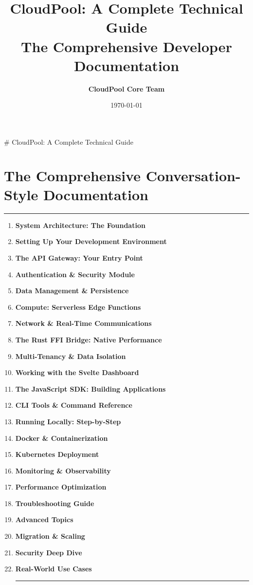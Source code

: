 \documentclass[11pt,a4paper]{report}
\title{\Huge\bfseries\color{primaryblue} CloudPool: A Complete Technical Guide \\ \Large The Comprehensive Developer Documentation}
\author{\textbf{CloudPool Core Team}}
\date{\today}
\begin{document}
\maketitle
\tableofcontents
\newpage

\# CloudPool: A Complete Technical Guide

\chapter{The Comprehensive Conversation-Style Documentation}



\vfill\hrule\vfill


\begin{enumerate}
\item \textbf{System Architecture: The Foundation}
\item \textbf{Setting Up Your Development Environment}
\item \textbf{The API Gateway: Your Entry Point}
\item \textbf{Authentication \& Security Module}
\item \textbf{Data Management \& Persistence}
\item \textbf{Compute: Serverless Edge Functions}
\item \textbf{Network \& Real-Time Communications}
\item \textbf{The Rust FFI Bridge: Native Performance}
\item \textbf{Multi-Tenancy \& Data Isolation}
\item \textbf{Working with the Svelte Dashboard}
\item \textbf{The JavaScript SDK: Building Applications}
\item \textbf{CLI Tools \& Command Reference}
\item \textbf{Running Locally: Step-by-Step}
\item \textbf{Docker \& Containerization}
\item \textbf{Kubernetes Deployment}
\item \textbf{Monitoring \& Observability}
\item \textbf{Performance Optimization}
\item \textbf{Troubleshooting Guide}
\item \textbf{Advanced Topics}
\item \textbf{Migration \& Scaling}
\item \textbf{Security Deep Dive}
\item \textbf{Real-World Use Cases}


\vfill\hrule\vfill


\end{enumerate}
\end{document}
